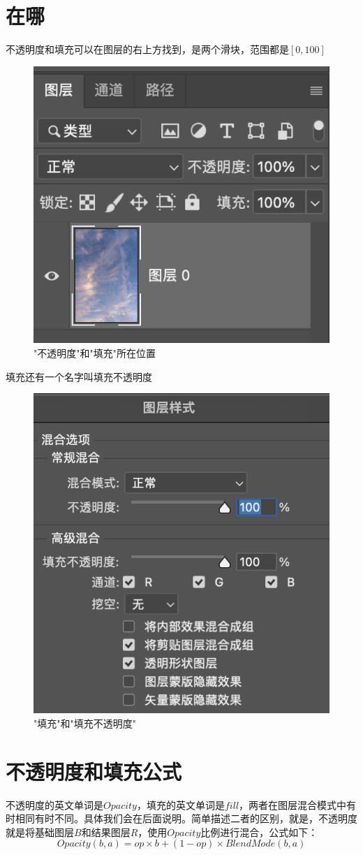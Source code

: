 \section{在哪}
不透明度和填充可以在图层的右上方找到，是两个滑块，范围都是$[0,100]$

\begin{figure}[!htb]
	\centering
	\includegraphics[width=0.4\linewidth]{figure/fillandopacity}
	\caption{"不透明度"和"填充"所在位置}
	\label{fig:fillandopacity}
\end{figure}

填充还有一个名字叫填充不透明度
\begin{figure}[!htb]
	\centering
	\includegraphics[width=0.4\linewidth]{figure/fill3}
	\caption{"填充"和"填充不透明度"}
	\label{fig:fill2}
\end{figure}

\section{ 不透明度和填充公式}
不透明度的英文单词是$Opacity$，填充的英文单词是$fill$，两者在图层混合模式中有时相同有时不同。具体我们会在后面说明。简单描述二者的区别，就是，不透明度就是将基础图层$B$和结果图层$R$，使用$Opacity$比例进行混合，公式如下：
\begin{equation}
	Opacity(b,a)= op\times b + (1-op)\times BlendMode(b,a)
\end{equation}


